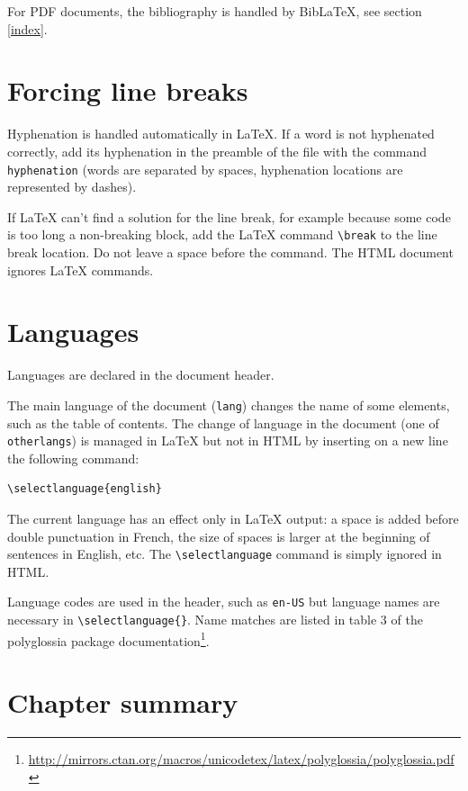 \documentclass[
  12pt,
  american,
  a4paper,
  extrafontsizes,onecolumn,openright
  ]{memoir}
\begin{document}
For PDF documents, the bibliography is handled by BibLaTeX, see section \ref{index}.

\hypertarget{forcing-line-breaks}{%
\section{Forcing line breaks}\label{forcing-line-breaks}}

Hyphenation is handled automatically in LaTeX.
If a word is not hyphenated correctly, add its hyphenation in the preamble of the file with the command \texttt{hyphenation} (words are separated by spaces, hyphenation locations are represented by dashes).

If LaTeX can't find a solution for the line break, for example because some code is too long a non-breaking block, add the LaTeX command \texttt{\textbackslash{}break} to the line break location.
Do not leave a space before the command.
The HTML document ignores LaTeX commands.

\hypertarget{sec:languages}{%
\section{Languages}\label{sec:languages}}

Languages are declared in the document header.

The main language of the document (\texttt{lang}) changes the name of some elements, such as the table of contents.
The change of language in the document (one of \texttt{otherlangs}) is managed in LaTeX but not in HTML by inserting on a new line the following command:

\begin{verbatim}
\selectlanguage{english}
\end{verbatim}

The current language has an effect only in LaTeX output: a space is added before double punctuation in French, the size of spaces is larger at the beginning of sentences in English, etc.
The \texttt{\textbackslash{}selectlanguage} command is simply ignored in HTML.

Language codes are used in the header, such as \texttt{en-US} but language names are necessary in \texttt{\textbackslash{}selectlanguage\{\}}.
Name matches are listed in table 3 of the polyglossia package documentation\footnote{\url{http://mirrors.ctan.org/macros/unicodetex/latex/polyglossia/polyglossia.pdf}}.

\hypertarget{chapter-summary}{%
\section{Chapter summary}\label{chapter-summary}}
\end{document}
